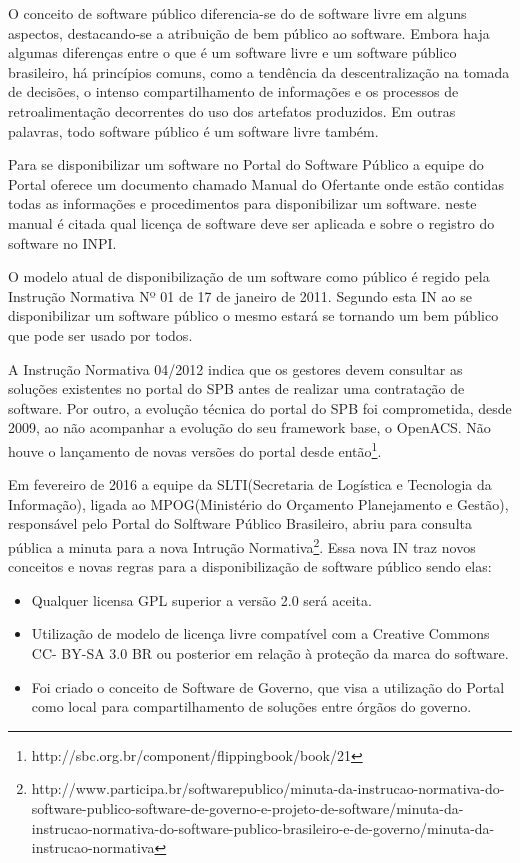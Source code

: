 O conceito de software público diferencia-se do de software livre em alguns aspectos, destacando-se
a atribuição de bem público ao software. Embora haja algumas diferenças entre o que é um software
livre e um software público brasileiro, há princípios comuns, como a tendência da descentralização na
tomada de decisões, o intenso compartilhamento de informações e os processos de retroalimentação
decorrentes do uso dos artefatos produzidos. Em outras palavras, todo software público é um software
livre também.

Para se disponibilizar um software no Portal do Software Público a equipe do Portal 
oferece um documento chamado Manual do Ofertante onde estão contidas todas as 
informações e procedimentos para disponibilizar um software. neste manual é citada
qual licença de software deve ser aplicada e sobre o registro do software no INPI. 

O modelo atual de disponibilização de um software como público é
regido pela Instrução Normativa Nº 01 de 17 de janeiro de 2011. 
Segundo esta IN ao se disponibilizar um software público o mesmo estará se tornando um bem público
que pode ser usado por todos.

A Instrução Normativa 04/2012 indica que os gestores devem consultar as soluções 
existentes no portal do SPB antes de realizar uma contratação de software. Por outro,
a evolução técnica do portal do SPB foi comprometida, desde 2009, ao não acompanhar 
a evolução do seu framework base, o OpenACS. Não houve o lançamento de novas versões do
portal desde então\footnote{http://sbc.org.br/component/flippingbook/book/21}.

Em fevereiro de 2016 a equipe da SLTI(Secretaria de Logística e Tecnologia da Informação), ligada ao
MPOG(Ministério do Orçamento Planejamento e Gestão), responsável pelo Portal do Solftware
Público Brasileiro, abriu para consulta pública a minuta para a nova Intrução 
Normativa\footnote{http://www.participa.br/softwarepublico/minuta-da-instrucao-normativa-do-software-publico-software-de-governo-e-projeto-de-software/minuta-da-instrucao-normativa-do-software-publico-brasileiro-e-de-governo/minuta-da-instrucao-normativa}.
Essa nova IN traz novos conceitos e novas regras para a disponibilização de software público sendo elas:

\begin{itemize}

\item Qualquer licensa GPL superior a versão 2.0 será aceita.

\item Utilização de modelo de licença livre compatível com a Creative Commons CC-
BY-SA 3.0 BR ou posterior em relação à proteção da marca do software.

\item Foi criado o conceito de Software de Governo, que visa a utilização do Portal
como local para compartilhamento de soluções entre órgãos do governo.

\end{itemize}

